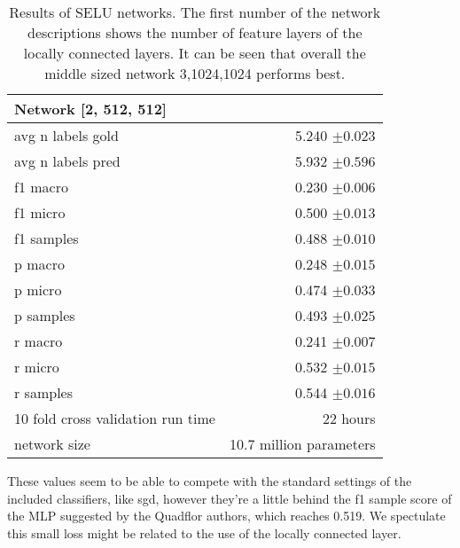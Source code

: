 \documentclass{article}
\begin{document}
\begin{table} [H]
  \begin{tabular}{l | r}
   \textbf{Network [2, 512, 512]} &  \\
   \hline
   \hline
   avg n labels gold & 5.240 $\pm 0.023$ \\
   \hline
   avg n labels pred & 5.932 $\pm 0.596$ \\
   \hline
   f1 macro & 0.230 $\pm 0.006$ \\
   \hline
   f1 micro & 0.500 $\pm 0.013$ \\
   \hline
   f1 samples & 0.488 $\pm 0.010$ \\
   \hline
   p macro & 0.248 $\pm 0.015 $ \\
   \hline
   p micro & 0.474 $\pm 0.033 $ \\
   \hline
   p samples & 0.493 $\pm 0.025$ \\
   \hline
   r macro & 0.241 $\pm 0.007$ \\
   \hline
   r micro & 0.532  $\pm  0.015$ \\
   \hline
   r samples & 0.544 $\pm 0.016 $ \\
   \hline
   10 fold cross validation run time & 22 hours \\
   \hline
   network size & 10.7 million parameters \\
  \end{tabular}
  
  \caption{Results of SELU networks. The first number of the network descriptions shows the number of feature layers of the locally connected layers. It can be seen that overall the 
  middle sized network 3,1024,1024 performs best.}
  \label{fig:selu_results}
\end{table}

These values seem to be able to compete with the standard settings of the included classifiers, like sgd, however they're a little behind the f1 sample score of the MLP suggested by the Quadflor authors, 
which reaches 0.519. We spectulate this small loss might be related to the use of the locally connected layer.
\end{document}
